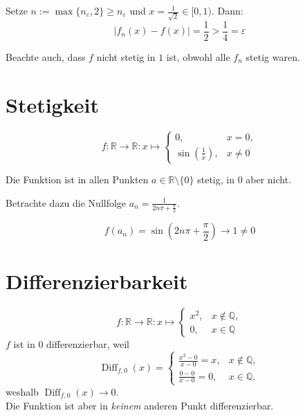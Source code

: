 \documentclass[10pt,a4paper]{article}
\DeclareMathOperator{\Diff}{Diff}
\begin{document}
\begin{multicols*}{2}
Setze $n := \max\{n_\varepsilon,2\}\ge n_\varepsilon$ und $x=\frac{1}{\sqrt{2}}\in[0,1)$. Dann:
\[|f_n(x)-f(x)|=\frac{1}{2}>\frac{1}{4}=\varepsilon\]

Beachte auch, dass $f$ nicht stetig in $1$ ist, obwohl alle $f_n$ stetig waren.

\section*{Stetigkeit}
\[f: \mathbb{R}\to\mathbb{R}: x\mapsto\begin{cases}0, & x=0, \\ \sin\left(\frac{1}{x}\right), & x\neq0 \end{cases}\]

Die Funktion ist in allen Punkten $a\in\mathbb{R}\setminus\{0\}$ stetig, in $0$ aber nicht.

Betrachte dazu die Nullfolge $a_n=\frac{1}{2n\pi+\frac{\pi}{2}}$.

\[f(a_n)=\sin(2n\pi+\frac{\pi}{2})\longrightarrow1\neq0\]

\section*{Differenzierbarkeit}
\[f:\mathbb{R}\to\mathbb{R}:x\mapsto\begin{cases}x^2, & x\notin\mathbb{Q}, \\ 0, & x\in\mathbb{Q}\end{cases}\]
$f$ ist in $0$ differenzierbar, weil
\[\Diff_{f,0}(x)=\begin{cases}\frac{x^2-0}{x-0}=x, & x\notin\mathbb{Q}, \\ \frac{0-0}{x-0}=0, & x\in\mathbb{Q}, \end{cases}\]
weshalb $\Diff_{f,0}(x)\to0$.\\

Die Funktion ist aber in \textit{keinem} anderen Punkt differenzierbar.

\end{multicols*}
\end{document}
